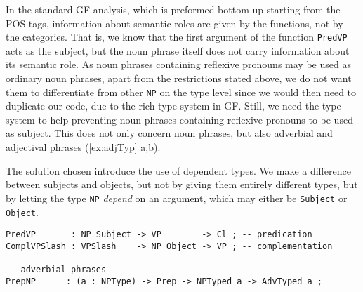 \documentclass[runningheads,a4paper]{llncs}
\begin{document}

In the standard GF analysis, which is preformed bottom-up starting from the
POS-tags, information about semantic roles are given by the functions, not by the
categories. That is, we know that the first argument of the function
\verb-PredVP- acts as the subject, but the noun phrase itself does not carry
information about its semantic role.
As noun phrases containing reflexive pronouns may be used as ordinary
noun phrases, apart from the restrictions stated above,
we do not want them to differentiate
from other \verb-NP- on the type level since we would then need to duplicate
our code, due to the rich type system in GF. Still, we need the type system to
help preventing noun phrases containing reflexive pronouns to be used as subject.
This does not only concern noun phrases, but also adverbial and adjectival phrases 
(\ref{ex:adjTyp} a,b).
\label{ex:adjTyp}

The solution chosen introduce the use of dependent types.
We make a difference between subjects and objects, but not
by giving them entirely different types, but by 
letting the type \verb-NP- \textit{depend} on an argument, which may either be \verb-Subject- or
\verb-Object-.
\begin{verbatim}
PredVP       : NP Subject -> VP        -> Cl ; -- predication
ComplVPSlash : VPSlash    -> NP Object -> VP ; -- complementation

-- adverbial phrases 
PrepNP      : (a : NPType) -> Prep -> NPTyped a -> AdvTyped a ; 
\end{verbatim}
\end{document}
